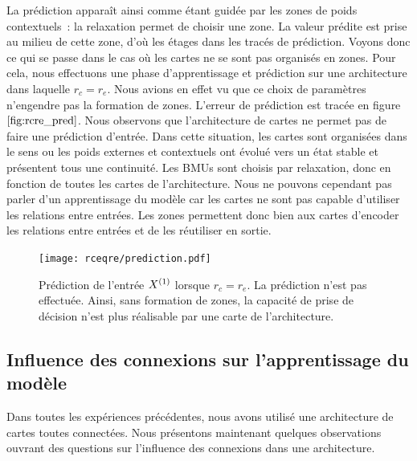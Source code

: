 \documentclass[../main]{subfiles}
\begin{document}
La prédiction apparaît ainsi comme étant guidée par les zones de poids contextuels~: la relaxation permet de choisir une zone. La valeur prédite est prise au milieu de cette zone, d'où les \og étages \fg{} dans les tracés de prédiction.
Voyons donc ce qui se passe dans le cas où les cartes ne se sont pas organisés en zones.
Pour cela, nous effectuons une phase d'apprentissage et prédiction sur une architecture dans laquelle $r_c = r_e$. 
Nous avions en effet vu que ce choix de paramètres n'engendre pas la formation de zones. L'erreur de prédiction est tracée en figure $\ref{fig:rcre_pred}$.
Nous observons que l'architecture de cartes ne permet pas de faire une prédiction d'entrée.
Dans cette situation, les cartes sont \og organisées \fg{} dans le sens ou les poids externes et contextuels ont évolué vers un état stable et présentent tous une continuité. Les BMUs sont choisis par relaxation, donc en fonction de toutes les cartes de l'architecture. Nous ne pouvons cependant pas parler d'un apprentissage du modèle car les cartes ne sont pas capable d'utiliser les relations entre entrées.
Les zones permettent donc bien aux cartes d'encoder les relations entre entrées et de les réutiliser en sortie.

\begin{figure}
	\centering\texttt{[image: rceqre/prediction.pdf]}
	\caption{Prédiction de l'entrée $X^{({1})}$ lorsque $r_c = r_e$. La prédiction n'est pas effectuée. Ainsi, sans formation de zones, la capacité de prise de décision n'est plus réalisable par une carte de l'architecture. \label{fig:rcre_pred}}
\end{figure}
	

\subsection{Influence des connexions sur l'apprentissage du modèle}

Dans toutes les expériences précédentes, nous avons utilisé une architecture de cartes toutes connectées. Nous présentons maintenant quelques observations ouvrant des questions sur l'influence des connexions dans une architecture.
\end{document}
